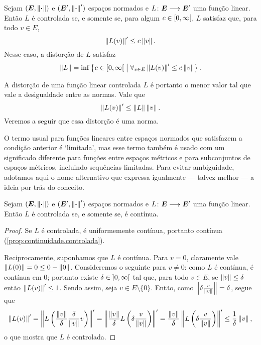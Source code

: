 \begin{exercise}
Sejam $(\bm E,\left\Vert{\bm{\cdot}}\right\Vert)$ e $(\bm E',\left\Vert{\bm{\cdot}}\right\Vert')$ espaços normados e $L\colon \allowbreak \bm E \longrightarrow \bm E'$ uma função linear. Então $L$ é controlada se, e somente se, para algum $c \in \left[0,\allowbreak \infty\right[$, $L$ satisfaz que, para todo $v \in E$,
	\begin{equation*}
	\left\Vert{L(v)}\right\Vert' \leq c \left\Vert{v}\right\Vert.
	\end{equation*}
Nesse caso, a distorção de $L$ satisfaz
	\begin{equation*}
	\left\Vert{L}\right\Vert = \inf\left\{ c \in \left[0,\allowbreak \infty\right[ \;\middle\vert\; \forall_{v \in E} \left\Vert{L(v)}\right\Vert' \leq c\left\Vert{v}\right\Vert \right\}.
	\end{equation*}
\end{exercise}

A distorção de uma função linear controlada $L$ é portanto o menor valor tal que vale a desigualdade entre as normas. Vale que
	\begin{equation*}
	\left\Vert{L(v)}\right\Vert' \leq \left\Vert{L}\right\Vert\left\Vert{v}\right\Vert.
	\end{equation*}
Veremos a seguir que essa distorção é uma norma.

O termo usual para funções lineares entre espaços normados que satisfazem a condição anterior é `limitada', mas esse termo também é usado com um significado diferente para funções entre espaços métricos e para subconjuntos de espaços métricos, incluindo sequências limitadas. Para evitar ambiguidade, adotamos aqui o nome alternativo que expressa igualmente --- talvez melhor --- a ideia por trás do conceito.

\begin{proposition}
Sejam $(\bm E,\left\Vert{\bm{\cdot}}\right\Vert)$ e $(\bm E',\left\Vert{\bm{\cdot}}\right\Vert')$ espaços normados e $L\colon \allowbreak \bm E \longrightarrow \bm E'$ uma função linear. Então $L$ é controlada se, e somente se, é contínua.
\end{proposition}
\begin{proof}
Se $L$ é controlada, é uniformemente contínua, portanto contínua (\ref{prop:continuidade.controlada}).

Reciprocamente, suponhamos que $L$ é contínua. Para $v=0$, claramente vale $\left\Vert{L(0)}\right\Vert = 0 \leq 0 - \left\Vert{0}\right\Vert$. Consideremos o seguinte para $v \neq 0$: como $L$ é contínua, é contínua em $0$; portanto existe $\delta \in \left]0,\allowbreak \infty\right[$ tal que, para todo $v \in E$, se $\left\Vert{v}\right\Vert \leq \delta$ então $\left\Vert{L(v)}\right\Vert' \leq 1$. Sendo assim, seja $v \in E \setminus \{0\}$. Então, como $\left\Vert{\delta\frac{v}{\left\Vert{v}\right\Vert}}\right\Vert=\delta$, segue que
	\begin{equation*}
	\left\Vert{L(v)}\right\Vert' = \left\Vert{L\left(\frac{\left\Vert{v}\right\Vert}{\delta}\frac{\delta}{\left\Vert{v}\right\Vert}v\right)}\right\Vert' = \left\Vert{\frac{\left\Vert{v}\right\Vert}{\delta}L\left(\delta\frac{v}{\left\Vert{v}\right\Vert}\right)}\right\Vert' = \frac{\left\Vert{v}\right\Vert}{\delta}\left\Vert{L\left(\delta\frac{v}{\left\Vert{v}\right\Vert}\right)}\right\Vert' \leq \frac{1}{\delta}\left\Vert{v}\right\Vert,
	\end{equation*}
o que mostra que $L$ é controlada.
\end{proof}

